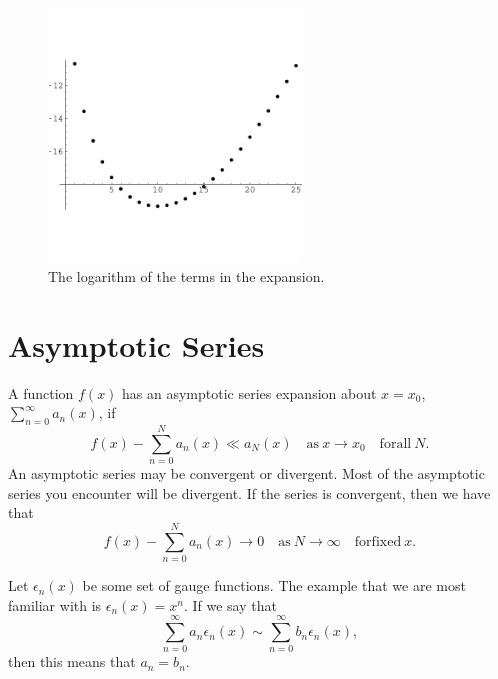\begin{Example}
  \begin{figure}[h!]
    \begin{center}
      \includegraphics[width=0.6\textwidth]{ode/asymptotic/log_nt}
    \end{center}
    \caption{The logarithm of the terms in the expansion.}
    \label{log_nth_term}
  \end{figure}




\end{Example}




\section{Asymptotic Series}

A function $f(x)$ has an asymptotic series expansion about $x=x_0$, 
$\sum_{n=0}^\infty a_n(x)$, if
\[ f(x) - \sum_{n=0}^N a_n(x) \ll a_N(x) \quad \mathrm{as}\ x \to x_0 \quad
\mathrm{for all}\ N.\]
An asymptotic series may be convergent or divergent.  Most of the 
asymptotic series you encounter will be divergent.  If the series is
convergent, then we have that
\[ f(x) - \sum_{n=0}^N a_n(x) \to 0 \quad \mathrm{as}\ N \to \infty
\quad \mathrm{for fixed}\ x.\]




Let $\epsilon_n(x)$ be some set of gauge functions.  The example that we 
are most familiar with is $\epsilon_n(x) = x^n$.  If we say that
\[ \sum_{n=0}^\infty a_n \epsilon_n(x) \sim 
\sum_{n=0}^\infty b_n \epsilon_n(x),\]
then this means that $a_n = b_n$.























